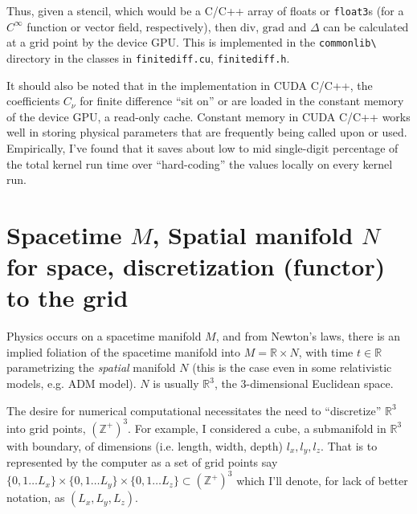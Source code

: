 \documentclass[10pt]{amsart}
\begin{document}
Thus, given a stencil, which would be a C/C++ array of floats or \verb|float3|s (for a $C^{\infty}$ function or vector field, respectively), then $\text{div}$, $\text{grad}$ and $\Delta $ can be calculated at a grid point by the device GPU.  This is implemented in the \verb|commonlib\| directory in the classes in \verb|finitediff.cu|, \verb|finitediff.h|.

It should also be noted that in the implementation in CUDA C/C++, the coefficients $C_{\nu}$ for finite difference ``sit on'' or are loaded in the constant memory of the device GPU, a read-only cache.  Constant memory in CUDA C/C++ works well in storing physical parameters that are frequently being called upon or used.  Empirically, I've found that it saves about low to mid single-digit percentage of the total kernel run time over ``hard-coding'' the values locally on every kernel run.  





\section{Spacetime $M$, Spatial manifold $N$ for space, discretization (functor) to the grid}
Physics occurs on a spacetime manifold $M$, and from Newton's laws, there is an implied foliation of the spacetime manifold into $M=\mathbb{R}\times N$, with time $t\in \mathbb{R}$ parametrizing the \emph{spatial} manifold $N$ (this is the case even in some relativistic models, e.g. ADM model).  $N$ is usually $\mathbb{R}^3$, the 3-dimensional Euclidean space.  

The desire for numerical computational necessitates the need to ``discretize'' $\mathbb{R}^3$ into grid points, $(\mathbb{Z}^+)^3$.  For example, I considered a cube, a submanifold in $\mathbb{R}^3$ with boundary, of dimensions (i.e. length, width, depth) $l_x,l_y,l_z$.  That is to represented by the computer as a set of grid points say $\lbrace 0, 1 \dots L_x \rbrace \times \lbrace 0, 1 \dots L_y \rbrace \times \lbrace 0, 1 \dots L_z \rbrace \subset (\mathbb{Z}^+)^3$ which I'll denote, for lack of better notation, as $(L_x,L_y,L_z)$.  
\end{document}
